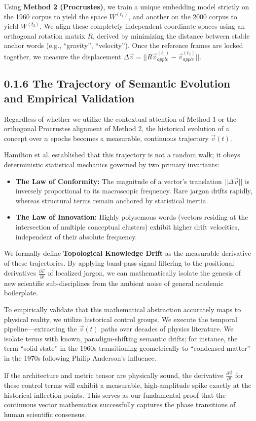 Using \textbf{Method 2 (Procrustes)}, we train a unique embedding model strictly on the 1960 corpus to yield the space $W^{(t_1)}$, and another on the 2000 corpus to yield $W^{(t_2)}$. We align these completely independent coordinate spaces using an orthogonal rotation matrix $R$, derived by minimizing the distance between stable anchor words (e.g., ``gravity'', ``velocity''). Once the reference frames are locked together, we measure the displacement $\Delta \vec{v} = ||R\vec{v}_{apple}^{(t_1)} - \vec{v}_{apple}^{(t_2)}||$.

\subsection*{0.1.6 The Trajectory of Semantic Evolution and Empirical Validation}

Regardless of whether we utilize the contextual attention of Method 1 or the orthogonal Procrustes alignment of Method 2, the historical evolution of a concept over $n$ epochs becomes a measurable, continuous trajectory $\vec{v}(t)$.

Hamilton et al. \cite{Hamilton2018} established that this trajectory is not a random walk; it obeys deterministic statistical mechanics governed by two primary invariants:
\begin{itemize}
    \item \textbf{The Law of Conformity:} The magnitude of a vector's translation $||\Delta \vec{v}||$ is inversely proportional to its macroscopic frequency. Rare jargon drifts rapidly, whereas structural terms remain anchored by statistical inertia.
    \item \textbf{The Law of Innovation:} Highly polysemous words (vectors residing at the intersection of multiple conceptual clusters) exhibit higher drift velocities, independent of their absolute frequency.
\end{itemize}

We formally define \textbf{Topological Knowledge Drift} as the measurable derivative of these trajectories. By applying band-pass signal filtering to the positional derivatives $\frac{\partial \vec{v}}{\partial t}$ of localized jargon, we can mathematically isolate the genesis of new scientific sub-disciplines from the ambient noise of general academic boilerplate.

To empirically validate that this mathematical abstraction accurately maps to physical reality, we utilize historical control groups. We execute the temporal pipeline—extracting the $\vec{v}(t)$ paths over decades of physics literature. We isolate terms with known, paradigm-shifting semantic drifts; for instance, the term ``solid state'' in the 1960s transitioning geometrically to ``condensed matter'' in the 1970s following Philip Anderson's influence.

If the architecture and metric tensor are physically sound, the derivative $\frac{\partial \vec{v}}{\partial t}$ for these control terms will exhibit a measurable, high-amplitude spike exactly at the historical inflection points. This serves as our fundamental proof that the continuous vector mathematics successfully captures the phase transitions of human scientific consensus.


